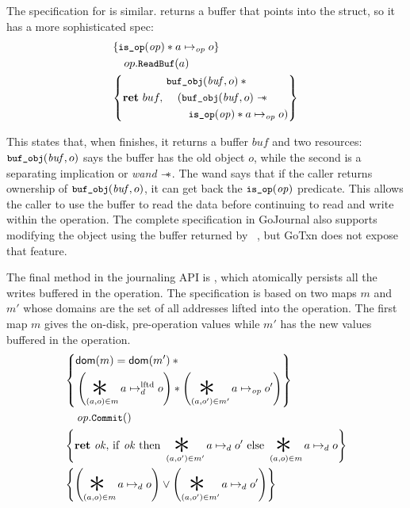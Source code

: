 The specification for  is similar. 
returns a buffer that points into the  struct, so it has a more
sophisticated spec:
%
\begin{align*}
  \hoareV{\cc{is_op}(\mathit{op}) \sep a \mapsto_{\mathit{op}} o}%
        {op.\cc{ReadBuf}(a)}%
        {\Ret{buf}
  \begin{aligned}
  &\cc{buf_obj}(\mathit{buf}, o) \sep \phantom{} \\
  &\quad( \cc{buf_obj}(\mathit{buf}, o) \wand \\
  &\quad\quad \cc{is_op}(\mathit{op}) \sep a \mapsto_{\mathit{op}} o )
    \end{aligned}}
\end{align*}

This states that, when  finishes, it returns a buffer $\mathit{buf}$
and two resources: $\cc{buf_obj}(\mathit{buf}, o)$ says the buffer has the old
object $o$, while the second is a separating implication or \emph{wand} $\mathrel{-\!\!\ast}$.
The wand says that if
the caller returns ownership of $\cc{buf_obj}(\mathit{buf}, o)$, it can get back
the $\cc{is_op}(\mathit{op})$ predicate. This allows the caller to use the
buffer to read the data before continuing to read and write within the
operation. The complete specification in GoJournal also supports modifying the
object using the buffer returned by ~\cite{chajed:gojournal}, but
GoTxn does not expose that feature.

The final method in the journaling API is , which atomically
persists all the writes buffered in the operation. The specification is based on
two maps $m$ and $m'$ whose domains are the set of all addresses lifted into the
operation. The first map $m$ gives the on-disk, pre-operation values while $m'$
has the new values buffered in the operation.
\begin{align*}
  \hoareCV{ \begin{aligned}
              &\dom(m) = \dom(m') \sep {} \\
  &\left( \bigast_{(a,o) \in m} a \mapstoLftd o \right) \sep %
  \left( \bigast_{(a,o') \in m'} a \mapstoOp o' \right)
            \end{aligned}} %
  {\mathit{op}.\cc{Commit}()}%
  {\Ret{\mathit{ok}} \mathrm{if~} \mathit{ok} %
  \mathrm{~then~} \bigast_{(a,o') \in m'} a \mapstoDisk o' \mathrm{~else~} %
    \bigast_{(a,o) \in m} a \mapstoDisk o}%
  {\left( \bigast_{(a,o) \in m} a \mapstoDisk o \right) \lor
    \left( \bigast_{(a,o') \in m'} a \mapstoDisk o' \right) }
\end{align*}

